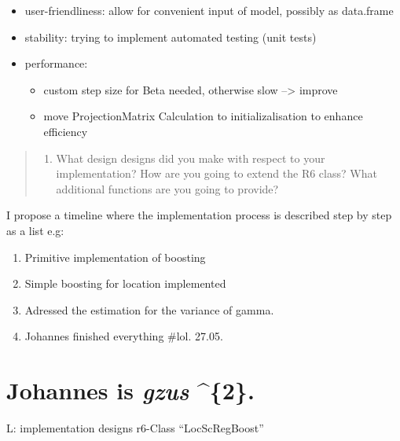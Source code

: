 \documentclass[
]{report}
\providecommand{\tightlist}{%
  \setlength{\itemsep}{0pt}\setlength{\parskip}{0pt}}
\begin{document}
\begin{itemize}
\tightlist
\item
  user-friendliness: allow for convenient input of model, possibly as
  data.frame
\item
  stability: trying to implement automated testing (unit tests)
\item
  performance:

  \begin{itemize}
  \tightlist
  \item
    custom step size for Beta needed, otherwise slow --\textgreater{}
    improve
  \item
    move ProjectionMatrix Calculation to initializalisation to enhance
    efficiency
  \end{itemize}
\end{itemize}

\begin{quote}
\begin{enumerate}
\def\labelenumi{\arabic{enumi}.}
\setcounter{enumi}{1}
\tightlist
\item
  What design designs did you make with respect to your implementation?
  How are you going to extend the R6 class? What additional functions
  are you going to provide?
\end{enumerate}
\end{quote}

I propose a timeline where the implementation process is described step
by step as a list e.g:

\begin{enumerate}
\def\labelenumi{\arabic{enumi}.}
\tightlist
\item
  Primitive implementation of boosting
\item
  Simple boosting for location implemented
\item
  Adressed the estimation for the variance of gamma.
\item
  Johannes finished everything \#lol. 27.05.
\end{enumerate}

\hypertarget{johannes-is-gzus-2.}{%
\section{\texorpdfstring{Johannes is \emph{gzus}
\^{}\{2\}.}{Johannes is gzus \^{}\{2\}.}}\label{johannes-is-gzus-2.}}

L: implementation designs r6-Class ``LocScRegBoost''
\end{document}

